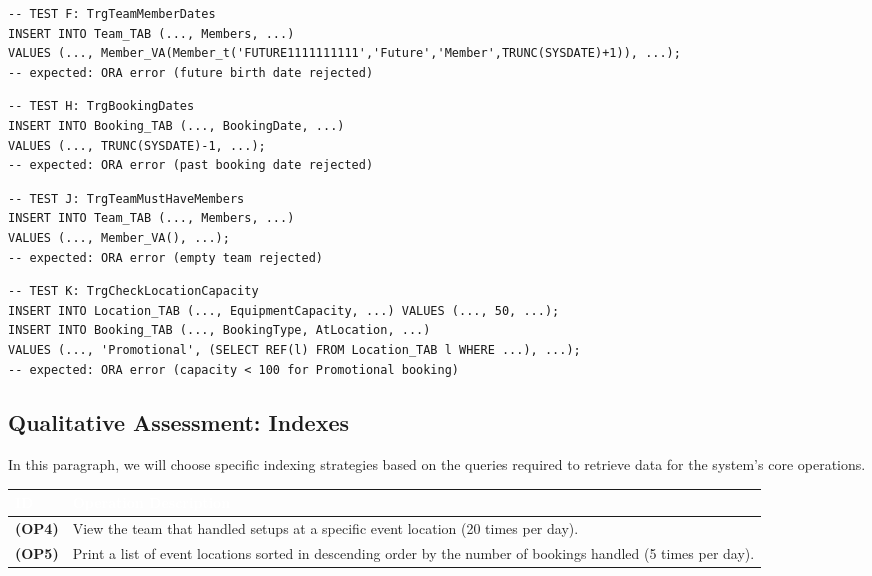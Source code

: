 \documentclass[12pt,a4paper]{article}
\begin{document}
\begin{verbatim}
-- TEST F: TrgTeamMemberDates
INSERT INTO Team_TAB (..., Members, ...)
VALUES (..., Member_VA(Member_t('FUTURE1111111111','Future','Member',TRUNC(SYSDATE)+1)), ...);
-- expected: ORA error (future birth date rejected)
\end{verbatim}

\begin{verbatim}
-- TEST H: TrgBookingDates
INSERT INTO Booking_TAB (..., BookingDate, ...)
VALUES (..., TRUNC(SYSDATE)-1, ...);
-- expected: ORA error (past booking date rejected)
\end{verbatim}

\begin{verbatim}
-- TEST J: TrgTeamMustHaveMembers
INSERT INTO Team_TAB (..., Members, ...)
VALUES (..., Member_VA(), ...);
-- expected: ORA error (empty team rejected)
\end{verbatim}

\begin{verbatim}
-- TEST K: TrgCheckLocationCapacity
INSERT INTO Location_TAB (..., EquipmentCapacity, ...) VALUES (..., 50, ...);
INSERT INTO Booking_TAB (..., BookingType, AtLocation, ...)
VALUES (..., 'Promotional', (SELECT REF(l) FROM Location_TAB l WHERE ...), ...);
-- expected: ORA error (capacity < 100 for Promotional booking)
\end{verbatim}

\subsection{Qualitative Assessment: Indexes}

In this paragraph, we will choose specific indexing strategies based on the queries required to retrieve data for the system's core operations.

\begin{table}[h!]
    \centering
    \small
    \begin{tabular}{|l|p{}|}
        \hline
        \rowcolor[rgb]{0.1, 0.3, 0.5} 
        \textcolor{white}{\textbf{ID}} & \textcolor{white}{\textbf{Operation Description}} \\ \hline
        \textbf{(OP4)} & View the team that handled setups at a specific event location (20 times per day). \\ \hline
        \textbf{(OP5)} & Print a list of event locations sorted in descending order by the number of bookings handled (5 times per day). \\ \hline
    \end{tabular}
\end{table}
\end{document}
